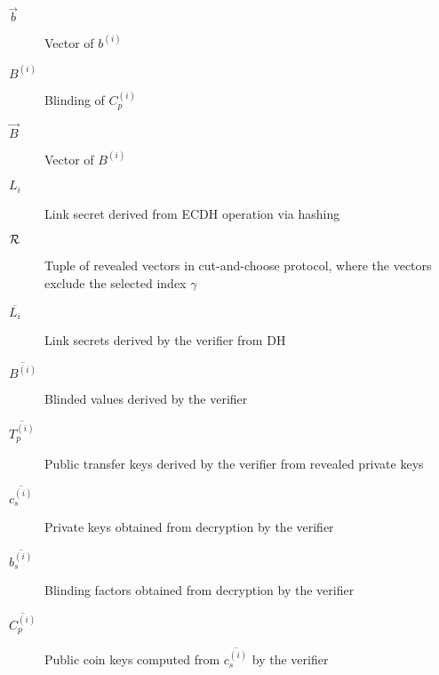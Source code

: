 \documentclass{llncs}
\begin{document}
\begin{description}
  \item[$\vec{b}$]{Vector of $b^{(i)}$}
  \item[$B^{(i)}$]{Blinding of $C_p^{(i)}$}
  \item[$\vec{B}$]{Vector of $B^{(i)}$}
  \item[$L_i$]{Link secret derived from ECDH operation via hashing}
  \item[$\cal{R}$]{Tuple of revealed vectors in cut-and-choose protocol,
    where the vectors exclude the selected index $\gamma$}
  \item[$\overline{L_i}$]{Link secrets derived by the verifier from DH}
  \item[$\overline{B^{(i)}}$]{Blinded values derived by the verifier}
  \item[$\overline{T_p^{(i)}}$]{Public transfer keys derived by the verifier from revealed private keys}
  \item[$\overline{c_s^{(i)}}$]{Private keys obtained from decryption by the verifier}
  \item[$\overline{b_s^{(i)}}$]{Blinding factors obtained from decryption by the verifier}
  \item[$\overline{C^{(i)}_p}$]{Public coin keys computed from $\overline{c_s^{(i)}}$ by the verifier}
\end{description}
\end{document}
